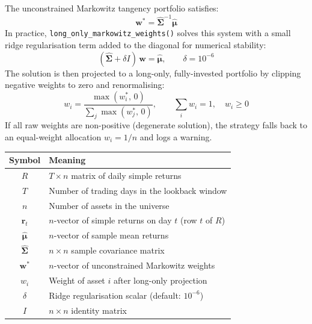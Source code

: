 \documentclass[11pt, a4paper]{article}
\newcommand{\code}[1]{\texttt{#1}}
\begin{document}
The unconstrained Markowitz tangency portfolio satisfies:
\begin{equation}
  \bm{w}^{*} = \hat{\bm{\Sigma}}^{-1}\hat{\bm{\mu}}
  \label{eq:mvo_raw}
\end{equation}
In practice, \code{long\_only\_markowitz\_weights()} solves this system with a
small ridge regularisation term added to the diagonal for numerical stability:
\begin{equation}
  (\hat{\bm{\Sigma}} + \delta I)\,\bm{w} = \hat{\bm{\mu}},
  \qquad \delta = 10^{-6}
  \label{eq:mvo_ridge}
\end{equation}
The solution is then projected to a long-only, fully-invested portfolio by
clipping negative weights to zero and renormalising:
\begin{equation}
  w_i = \frac{\max(w_i^{*},\,0)}{\sum_j \max(w_j^{*},\,0)},
  \qquad \sum_i w_i = 1,\quad w_i \geq 0
  \label{eq:mvo_clip}
\end{equation}
If all raw weights are non-positive (degenerate solution), the strategy falls
back to an equal-weight allocation $w_i = 1/n$ and logs a warning.

\medskip
\begin{center}
\begin{tabular}{@{}cl@{}}
  \toprule
  \textbf{Symbol} & \textbf{Meaning} \\
  \midrule
  $R$                     & $T \times n$ matrix of daily simple returns \\
  $T$                     & Number of trading days in the lookback window \\
  $n$                     & Number of assets in the universe \\
  $\bm{r}_t$              & $n$-vector of simple returns on day $t$ (row $t$ of $R$) \\
  $\hat{\bm{\mu}}$        & $n$-vector of sample mean returns \\
  $\hat{\bm{\Sigma}}$     & $n \times n$ sample covariance matrix \\
  $\bm{w}^{*}$            & $n$-vector of unconstrained Markowitz weights \\
  $w_i$                   & Weight of asset $i$ after long-only projection \\
  $\delta$                & Ridge regularisation scalar (default: $10^{-6}$) \\
  $I$                     & $n \times n$ identity matrix \\
  \bottomrule
\end{tabular}
\end{center}
\end{document}
